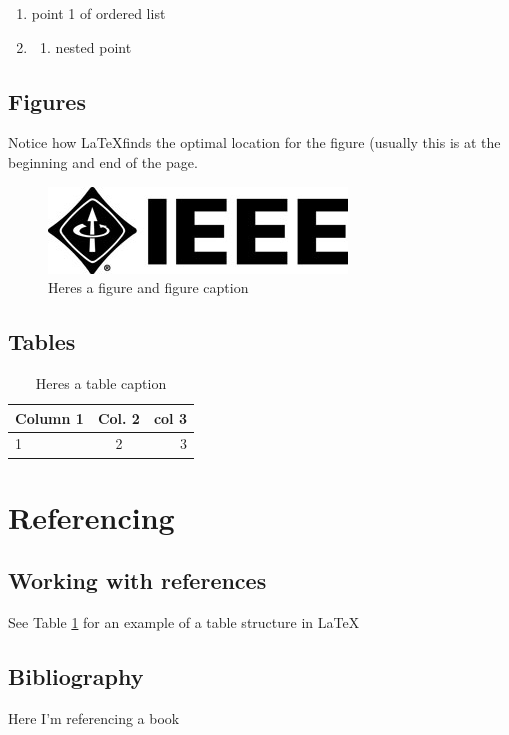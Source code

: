\documentclass{article}
\begin{document}
\begin{enumerate}	%
\item point 1 of ordered list
\item \begin{enumerate}
	\item nested point
\end{enumerate}
\end{enumerate}

\subsection{Figures}
Notice how \LaTeX finds the optimal location for the figure (usually this is at the beginning and end of the page. 

\begin{figure}
		\includegraphics[]{image}
    \caption{Heres a figure and figure caption} \label{exampleFigure}
\end{figure}

\subsection{Tables}
\begin{table}
\caption{Heres a table caption} \label{exampleTable}
\centering
\begin{tabular}	{|l | c r|}
	\hline
	Column 1 & Col. 2 & col 3 \\
    \hline
    1	& 2	& 3	\\
  	\hline
\end{tabular}
\end{table}

\section{Referencing}
\subsection{Working with references}
See Table \ref{exampleTable} for an example of a table structure in \LaTeX

\subsection{Bibliography}
Here I'm referencing a book \cite{exampleRef}


\end{document}
